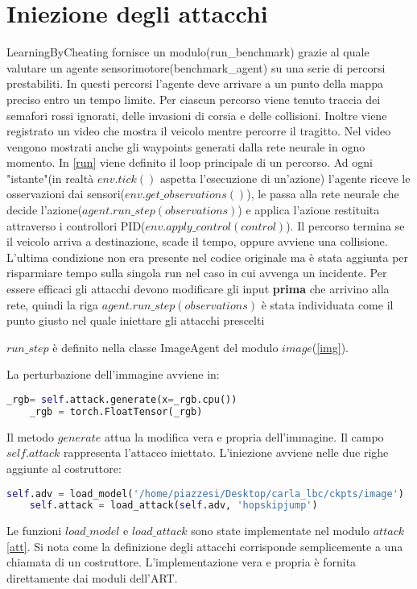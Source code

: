 \section{Iniezione degli attacchi}
LearningByCheating fornisce un modulo(run\_benchmark) grazie al quale valutare un agente sensorimotore(benchmark\_agent) su una serie di percorsi prestabiliti.
In questi percorsi l'agente deve arrivare a un punto della mappa preciso entro un tempo limite. Per ciascun percorso viene tenuto traccia dei semafori rossi ignorati, delle invasioni di corsia e delle collisioni. Inoltre viene registrato un video che mostra il veicolo mentre percorre il tragitto.
Nel video vengono mostrati anche gli waypoints generati dalla rete neurale in ogno momento. In \ref{run} viene definito il loop principale di un percorso.
Ad ogni "istante"(in realtà $env.tick()$ aspetta l'esecuzione di un'azione)  l'agente riceve le osservazioni dai sensori($env.get\_observations()$), le passa alla 
rete neurale che decide l'azione($agent.run\_step(observations)$) e applica l'azione restituita attraverso i controllori PID($env.apply\_control(control)$). Il percorso termina 
se il veicolo arriva a destinazione, scade il tempo, oppure avviene una collisione. L'ultima condizione non era presente nel codice originale ma è stata aggiunta per risparmiare tempo sulla singola run nel caso in cui avvenga un incidente. Per essere efficaci gli attacchi devono modificare gli input 
\textbf{prima} che arrivino alla rete, quindi la riga $agent.run\_step(observations)$ è stata individuata come il punto giusto nel quale iniettare gli attacchi prescelti

$run\_step$ è definito nella classe ImageAgent del  modulo $image$(\ref{img}).

La perturbazione dell'immagine avviene in:
\begin{lstlisting}[language=Python]
    _rgb= self.attack.generate(x=_rgb.cpu())
    _rgb = torch.FloatTensor(_rgb)
\end{lstlisting}
Il metodo $generate$ attua la modifica vera e propria dell'immagine. Il campo $self.attack$ rappresenta l'attacco iniettato. L'iniezione avviene nelle due righe aggiunte al costruttore:
\begin{lstlisting}[language=Python]
    self.adv = load_model('/home/piazzesi/Desktop/carla_lbc/ckpts/image')
    self.attack = load_attack(self.adv, 'hopskipjump')
\end{lstlisting}
Le funzioni $load\_model$ e $load\_attack$ sono state implementate nel modulo $attack$\ref{att}. Si nota come la definizione  degli attacchi corrisponde semplicemente a una chiamata
di un costruttore. L'implementazione vera e propria  è fornita direttamente dai moduli dell'ART.

